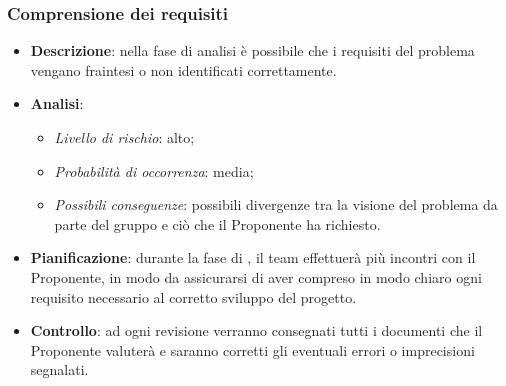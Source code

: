 		\subsubsection{Comprensione dei requisiti}
			\begin{itemize}
				\item \textbf{Descrizione}: nella fase di analisi è possibile che i requisiti del problema vengano fraintesi o non identificati correttamente. 
				\item \textbf{Analisi}:
				\begin{itemize}
					\item \textit{Livello di rischio}: alto;
					\item \textit{Probabilità di occorrenza}: media;
					\item \textit{Possibili conseguenze}: possibili divergenze tra la visione del problema da parte del gruppo e ciò che il Proponente ha richiesto.
				\end{itemize}
				\item \textbf{Pianificazione}: durante la fase di , il team effettuerà più incontri con il Proponente, in modo da assicurarsi di aver compreso in modo chiaro ogni requisito necessario al corretto sviluppo del progetto.
				\item \textbf{Controllo}: ad ogni revisione verranno consegnati tutti i documenti che il Proponente valuterà e saranno corretti gli eventuali errori o imprecisioni segnalati.
			\end{itemize}